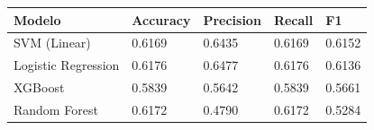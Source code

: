 \begin{tabular}{lllll}
\toprule
Modelo & Accuracy & Precision & Recall & F1 \\
\midrule
SVM (Linear) & 0.6169 & 0.6435 & 0.6169 & 0.6152 \\
Logistic Regression & 0.6176 & 0.6477 & 0.6176 & 0.6136 \\
XGBoost & 0.5839 & 0.5642 & 0.5839 & 0.5661 \\
Random Forest & 0.6172 & 0.4790 & 0.6172 & 0.5284 \\
\bottomrule
\end{tabular}
